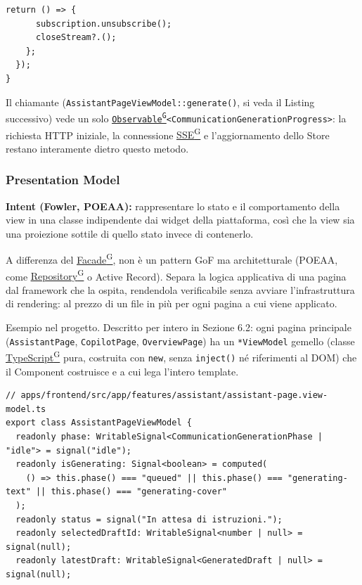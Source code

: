 \documentclass[a4paper,12pt]{article}
\providecommand{\glslink}[2]{\href{https://alittlebyte-19.github.io/Documentazione/glossario.html\#gls-#1}{\underline{#2}\textsuperscript{\scriptsize G}}}
\begin{document}
\begin{sloppypar}
\begin{lstlisting}[style=tslisting, caption={AssistantService: Facade su client HTTP generato, SseClient e MvpStateStore dietro generate()}]
    return () => {
      subscription.unsubscribe();
      closeStream?.();
    };
  });
}
\end{lstlisting}

Il chiamante (\texttt{AssistantPageViewModel::generate()}, si veda il Listing successivo) vede un solo \texttt{\glslink{observable}{Observable}<CommunicationGenerationProgress>}: la richiesta HTTP iniziale, la connessione \glslink{sse-server-sent-events}{SSE} e l'aggiornamento dello Store restano interamente dietro questo metodo.

\subsubsection{Presentation Model}

\textbf{Intent (Fowler, POEAA):} rappresentare lo stato e il comportamento della view in una classe indipendente dai widget della piattaforma, così che la view sia una proiezione sottile di quello stato invece di contenerlo.

A differenza del \glslink{facade}{Facade}, non è un pattern GoF ma architetturale (POEAA, come \glslink{repository}{Repository} o Active Record). Separa la logica applicativa di una pagina dal framework che la ospita, rendendola verificabile senza avviare l'infrastruttura di rendering: al prezzo di un file in più per ogni pagina a cui viene applicato.

Esempio nel progetto. Descritto per intero in Sezione 6.2: ogni pagina principale (\texttt{AssistantPage}, \texttt{CopilotPage}, \texttt{OverviewPage}) ha un \texttt{*ViewModel} gemello (classe \glslink{typescript}{TypeScript} pura, costruita con \texttt{new}, senza \texttt{inject()} né riferimenti al DOM) che il Component costruisce e a cui lega l'intero template.

\begin{lstlisting}[style=tslisting, caption={AssistantPageViewModel: classe pura costruita con new(), niente inject() né riferimenti al DOM}]
// apps/frontend/src/app/features/assistant/assistant-page.view-model.ts
export class AssistantPageViewModel {
  readonly phase: WritableSignal<CommunicationGenerationPhase | "idle"> = signal("idle");
  readonly isGenerating: Signal<boolean> = computed(
    () => this.phase() === "queued" || this.phase() === "generating-text" || this.phase() === "generating-cover"
  );
  readonly status = signal("In attesa di istruzioni.");
  readonly selectedDraftId: WritableSignal<number | null> = signal(null);
  readonly latestDraft: WritableSignal<GeneratedDraft | null> = signal(null);


\end{lstlisting}
\end{sloppypar}
\end{document}
